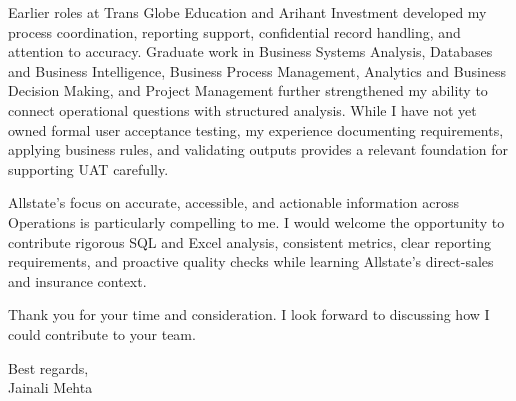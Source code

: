 \documentclass[letterpaper,11pt]{article}
\begin{document}
\bigbreak
Earlier roles at Trans Globe Education and Arihant Investment developed my process coordination, reporting support, confidential record handling, and attention to accuracy. Graduate work in Business Systems Analysis, Databases and Business Intelligence, Business Process Management, Analytics and Business Decision Making, and Project Management further strengthened my ability to connect operational questions with structured analysis. While I have not yet owned formal user acceptance testing, my experience documenting requirements, applying business rules, and validating outputs provides a relevant foundation for supporting UAT carefully.

\bigbreak
Allstate's focus on accurate, accessible, and actionable information across Operations is particularly compelling to me. I would welcome the opportunity to contribute rigorous SQL and Excel analysis, consistent metrics, clear reporting requirements, and proactive quality checks while learning Allstate's direct-sales and insurance context.

\bigbreak
Thank you for your time and consideration. I look forward to discussing how I could contribute to your team.

\bigbreak
Best regards,\\
Jainali Mehta
\end{document}
